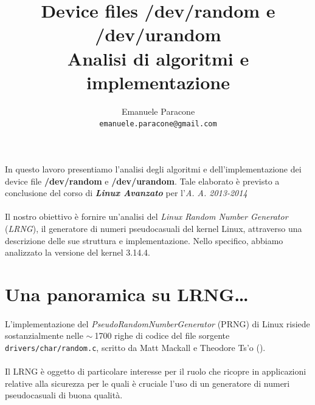 \documentclass{article}
\title{\textbf{ Device files /dev/random e /dev/urandom}\\[0.2cm]Analisi di
algoritmi e implementazione}
\author{Emanuele Paracone \\ \texttt{emanuele.paracone@gmail.com}}
\begin{document}
\maketitle
 
%

\section*{}
\paragraph{}In questo lavoro presentiamo l'analisi degli algoritmi e
dell'implementazione dei device file \textbf{/dev/random} e
\textbf{/dev/urandom}.
Tale elaborato è previsto a conclusione del corso di
\emph{\textbf{Linux Avanzato}} per l'\emph{A. A. 2013-2014} 

\paragraph{} Il nostro obiettivo è fornire un'analisi del \emph{Linux
Random Number Generator} (\emph{LRNG}), il generatore di numeri pseudocasuali del
kernel Linux, attraverso una descrizione delle sue struttura e
implementazione. Nello specifico, abbiamo analizzato la versione del kernel
3.14.4.

\section*{Una panoramica su LRNG\ldots}
 
\paragraph{}L'implementazione del \emph{PseudoRandomNumberGenerator} (PRNG) di
Linux risiede sostanzialmente nelle $\sim~$1700 righe di codice del file sorgente
\verb$drivers/char/random.c$, scritto da Matt Mackall e Theodore Ts'o (\cite{mack}).
\paragraph{} Il LRNG è oggetto di particolare interesse per il ruolo che ricopre
in applicazioni relative alla sicurezza per le quali è cruciale l'uso di un
generatore di numeri pseudocasuali di buona qualità. 
\end{document}
